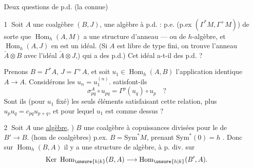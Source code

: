 Deux questions de p.d. (la  connue)

\textcircled{1} Soit $A$ une coalgèbre  $(B,J)$, une algèbre à p.d. : p.e. (p.ex $(\Gamma^*M,\Gamma^+M)$) de sorte que $\operatorname{Hom}_h(A,M)$ a une structure d’anneau --- ou de $h$-algèbre, et $\operatorname{Hom}_h(A,J)$ en est un idéal. (Si $A$ est libre de type fini, on trouve l’anneau $\check A\otimes B$ avec l’idéal $\check A\otimes J$,) qui a des p.d.) Cet idéal a-t-il des p.d. ?

 Prenons $B=\Gamma^*A$, $J=\Gamma^+A$, et soit $u_1\in\operatorname{Hom}_h(A,B)$ l’application identique $A\longrightarrow A$. Considérons les $u_n=u_1^{(n)}$. satisfont-ils
\[
\sigma_{pq}^A\circ u_{pq}=\Gamma^p(u_q)\circ u_p\quad ?
\]
Sont ils (pour $u_1$ fixé) les seuls éléments  satisfaisant cette relation, plus $u_pu_q=c_{pq}u_{p+q}$, et pour lequel $u_1$ est comme dessus ?

\textcircled{2} Soit $A$ une \uline{algèbre}, ) $B$ une coalgèbre à copuissances divisées pour le  de $B'\longrightarrow B$. (hom de coalgèbres) p.ex. $B=\mathrm{Sym}^*M$, prenant $\mathrm{Sym}^*(0)=h$ \unsure{---}. Donc sur $\operatorname{Hom}_h(B,A)$ il y a une structure de  algèbre, à p. div. sur
\[
\operatorname{Ker}\ \operatorname{Hom}_{\unsure{h|k}}(B,A)\longrightarrow\operatorname{Hom}_{\unsure{h|k}}(B',A).
\]
